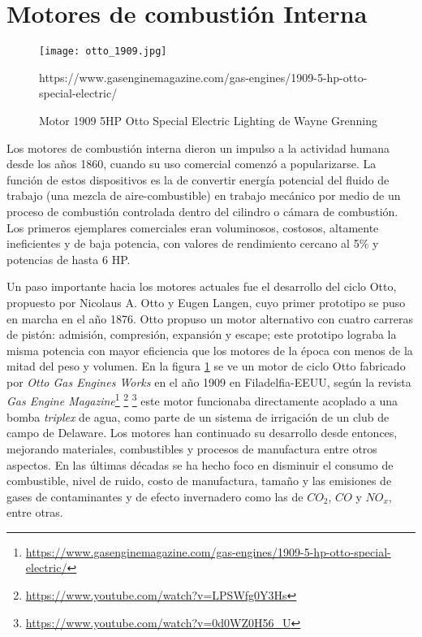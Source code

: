 \section{Motores de combustión Interna}

\begin{figure} \centering \texttt{[image: otto\_1909.jpg]}
    \caption{Motor 1909 5HP Otto Special Electric Lighting de Wayne
Grenning}\label{fig:otto1909} %
https://www.gasenginemagazine.com/gas-engines/1909-5-hp-otto-special-electric/
\end{figure}

Los motores de combustión interna dieron un impulso a la actividad humana desde
los años 1860, cuando su uso comercial comenzó a popularizarse.
%
La función de estos dispositivos es la de convertir energía potencial del fluido
de trabajo (una mezcla de aire-combustible) en trabajo mecánico por medio de un
proceso de combustión controlada dentro del cilindro o cámara de combustión.
%
Los primeros ejemplares comerciales eran voluminosos, costosos, altamente
ineficientes y de baja potencia, con valores de rendimiento cercano al 5\% y
potencias de hasta 6 HP.

Un paso importante hacia los motores actuales fue el desarrollo del ciclo Otto,
propuesto por Nicolaus A. Otto y Eugen Langen, cuyo primer prototipo se puso en
marcha en el año 1876.
%
Otto propuso un motor alternativo con cuatro carreras de pistón: admisión,
compresión, expansión y escape; este prototipo lograba la misma potencia con
mayor eficiencia que los motores de la época con menos de la mitad del peso y
volumen.
%
En la figura \ref{fig:otto1909} se ve un motor de ciclo Otto fabricado por
\emph{Otto Gas Engines Works} en el año 1909 en Filadelfia-EEUU, según la
revista \emph{Gas Engine
Magazine}\footnote{\url{https://www.gasenginemagazine.com/gas-engines/1909-5-hp-otto-special-electric/}}
\footnote{ \url{https://www.youtube.com/watch?v=LPSWfg0Y3Hs} } \footnote{
\url{https://www.youtube.com/watch?v=0d0WZ0H56_U} } este motor funcionaba
directamente acoplado a una bomba \emph{triplex} de agua, como parte de un
sistema de irrigación de un club de campo de Delaware.
%
Los motores han continuado su desarrollo desde entonces, mejorando materiales,
combustibles y procesos de manufactura entre otros aspectos.
%
En las últimas décadas se ha hecho foco en disminuir el consumo de combustible,
nivel de ruido, costo de manufactura, tamaño y las emisiones de gases de
contaminantes y de efecto invernadero como las de $CO_2$, $CO$ y $NO_x$, entre
otras.


